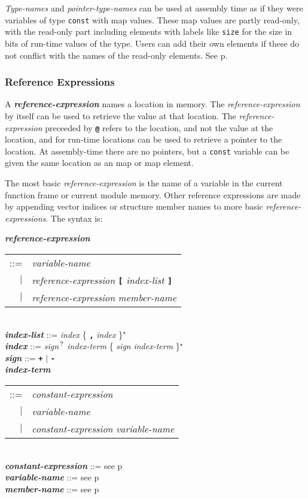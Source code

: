 \documentclass[12pt]{article}
\newcommand{\TT}[1]{{\tt \bfseries #1}}
\newcommand{\STAR}{{\Large $^\star$}}
\newcommand{\QMARK}{{$^{\,\mbox{\footnotesize ?}}$}}
\newcommand{\emkey}[1]{{\em \bfseries #1}}
\newcommand{\pagref}[1]{p\pageref{#1}}
\newenvironment{indpar}[1][0.3in]%
	{\begin{list}{}%
		     {\setlength{\itemsep}{0in}%
		      \setlength{\topsep}{0in}%
		      \setlength{\parsep}{1ex}%
		      \setlength{\labelwidth}{#1}%
		      \setlength{\leftmargin}{#1}%
		      \addtolength{\leftmargin}{\labelsep}}%
	 \item}%
	{\end{list}}
\begin{document}
{\em Type-names} and {\em pointer-type-names} can be used at
assembly time as if they were variables of type {\tt const}
with map values.  These map values are partly read-only,
with the read-only part including elements with labels like
{\tt size} for the size in bits of run-time values of the type.
Users can add their own elements if these do not conflict
with the names of the read-only elements.  See \pagref{TYPE-MAPS}.

\subsubsection{Reference Expressions}
\label{REFERENCE-EXPRESSIONS}

A \emkey{reference-expression} names a location in memory.
The {\em reference-expression} by itself can be used to retrieve
the value at that location.  The {\em reference-expression}
preceeded by \TT{@} refers to the location, and not the value
at the location, and for run-time locations can be used to retrieve
a pointer to the location.  At assembly-time there
are no pointers, but a {\tt const} variable can be given the
same location as an map or map element.

The most basic {\em reference-expression} is the name of a variable
in the current function frame or current module memory.  Other
reference expressions are made by appending vector indices or structure
member names to more basic {\em reference-expressions}.  The syntax
is:

\begin{indpar}
\emkey{reference-expression}
    \begin{tabular}[t]{rl}
    ::= & {\em variable-name} \\
    $|$ & {\em reference-expression} \TT{[} {\em index-list} \TT{]} \\
    $|$ & {\em reference-expression} {\em member-name} \\
    \end{tabular}
\\[0.5ex]
\emkey{index-list} ::= {\em index} \{ \TT{,} {\em index} \}\STAR{}
\\[0.5ex]
\emkey{index}\label{REFERENCE-INDEX}
    ::= {\em sign}\QMARK{} {\em index-term}
        \{ {\em sign} {\em index-term} \}\STAR{}
\\[0.5ex]
\emkey{sign} ::= \TT{+} $|$ \TT{-}
\\[0.5ex]
\emkey{index-term}
    \begin{tabular}[t]{rl}
    ::= & {\em constant-expression} \\
    $|$ & {\em variable-name} \\
    $|$ & {\em constant-expression} \TT{*} {\em variable-name} \\
    \end{tabular}
\\[0.5ex]
\emkey{constant-expression} ::= see \pagref{CONSTANT-EXPRESSION}
\\[0.5ex]
\emkey{variable-name} ::= see \pagref{VARIABLE-NAME}
\\[0.5ex]
\emkey{member-name} ::= see \pagref{MEMBER-NAME}
\end{indpar}
\end{document}
